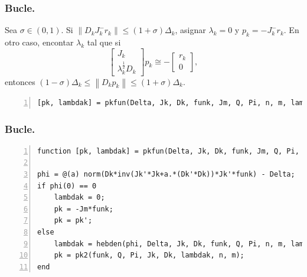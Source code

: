 \documentclass{beamer}
\newcommand{\norm}[1]{\left\lVert#1\right\rVert}
\begin{document}
\begin{frame}[fragile]
    \frametitle{Bucle.}
\begin{steps}[start=3]
    \item Sea $\sigma \in (0,1)$. Si $\norm{D_kJ_k^{-}r_k} \leq (1+\sigma) \Delta_k$,
        asignar $\lambda_k = 0$ y $p_k = -J_k^{-}r_k$. En otro caso, encontar $\lambda_k$
        tal que si
        \begin{equation*}
            \left[
                \begin{array}{c}
                    J_k \\
                    \lambda_k^{\frac{1}{2}}D_k
                \end{array}
            \right]p_k
            \cong
            -\left[
                \begin{array}{c}
                    r_k \\
                    0
                \end{array}
            \right],
        \end{equation*}
        entonces $(1-\sigma)\Delta_k \leq \norm{D_kp_k} \leq (1+\sigma)\Delta_k$.
\end{steps}\pause
\vspace{0.5cm}
\begin{lstlisting}[frame=single, numbers=left, style=Matlab-editor]
% parametro levenberg-marquardt
[pk, lambdak] = pkfun(Delta, Jk, Dk, funk, Jm, Q, Pi, n, m, lambdak, maxit2);
\end{lstlisting}
\end{frame}


\begin{frame}[fragile]
    \frametitle{Bucle.}
\begin{lstlisting}[frame=single, numbers=left, style=Matlab-editor]
function [pk, lambdak] = pkfun(Delta, Jk, Dk, funk, Jm, Q, Pi, n, m, lambdak, maxit)

phi = @(a) norm(Dk*inv(Jk'*Jk+a.*(Dk'*Dk))*Jk'*funk) - Delta;
if phi(0) == 0
    lambdak = 0;
    pk = -Jm*funk;
    pk = pk';
else
    lambdak = hebden(phi, Delta, Jk, Dk, funk, Q, Pi, n, m, lambdak, maxit);
    pk = pk2(funk, Q, Pi, Jk, Dk, lambdak, n, m);
end
\end{lstlisting}
\end{frame}
\end{document}

